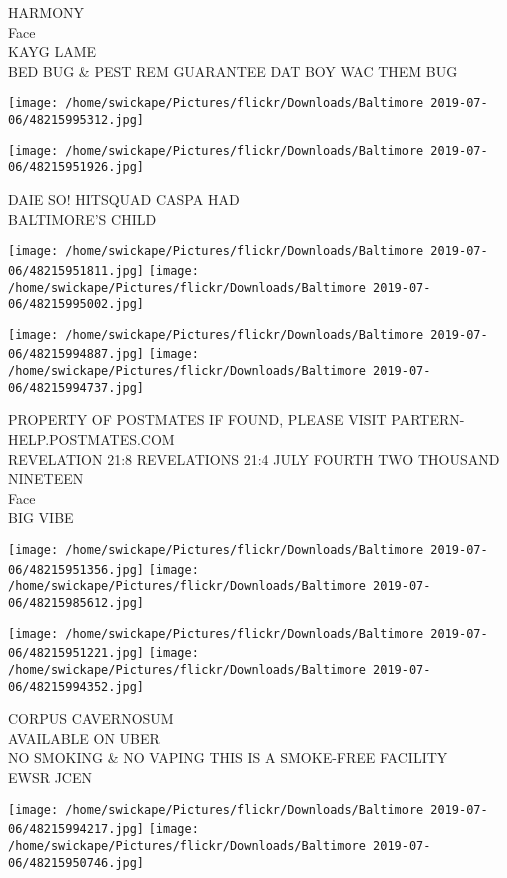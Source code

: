 \documentclass[10pt,letterpaper]{article}
\begin{document}
HARMONY\\
Face\\
KAYG LAME\\
BED BUG \& PEST REM GUARANTEE DAT BOY WAC THEM BUG
\pagebreak

\texttt{[image: /home/swickape/Pictures/flickr/Downloads/Baltimore 2019-07-06/48215995312.jpg]}

\vspace{0.25in}
\texttt{[image: /home/swickape/Pictures/flickr/Downloads/Baltimore 2019-07-06/48215951926.jpg]}

DAIE SO! HITSQUAD CASPA HAD\\
BALTIMORE'S CHILD
\pagebreak

\texttt{[image: /home/swickape/Pictures/flickr/Downloads/Baltimore 2019-07-06/48215951811.jpg]}
\texttt{[image: /home/swickape/Pictures/flickr/Downloads/Baltimore 2019-07-06/48215995002.jpg]}

\texttt{[image: /home/swickape/Pictures/flickr/Downloads/Baltimore 2019-07-06/48215994887.jpg]}
\texttt{[image: /home/swickape/Pictures/flickr/Downloads/Baltimore 2019-07-06/48215994737.jpg]}

PROPERTY OF POSTMATES IF FOUND, PLEASE VISIT PARTERN{-}HELP.POSTMATES.COM\\
REVELATION 21:8 REVELATIONS 21:4 JULY FOURTH TWO THOUSAND NINETEEN\\
Face\\
BIG VIBE
\pagebreak

\texttt{[image: /home/swickape/Pictures/flickr/Downloads/Baltimore 2019-07-06/48215951356.jpg]}
\texttt{[image: /home/swickape/Pictures/flickr/Downloads/Baltimore 2019-07-06/48215985612.jpg]}

\texttt{[image: /home/swickape/Pictures/flickr/Downloads/Baltimore 2019-07-06/48215951221.jpg]}
\texttt{[image: /home/swickape/Pictures/flickr/Downloads/Baltimore 2019-07-06/48215994352.jpg]}

CORPUS CAVERNOSUM\\
AVAILABLE ON UBER\\
NO SMOKING \& NO VAPING THIS IS A SMOKE{-}FREE FACILITY\\
EWSR JCEN
\pagebreak

\texttt{[image: /home/swickape/Pictures/flickr/Downloads/Baltimore 2019-07-06/48215994217.jpg]}
\texttt{[image: /home/swickape/Pictures/flickr/Downloads/Baltimore 2019-07-06/48215950746.jpg]}
\end{document}
